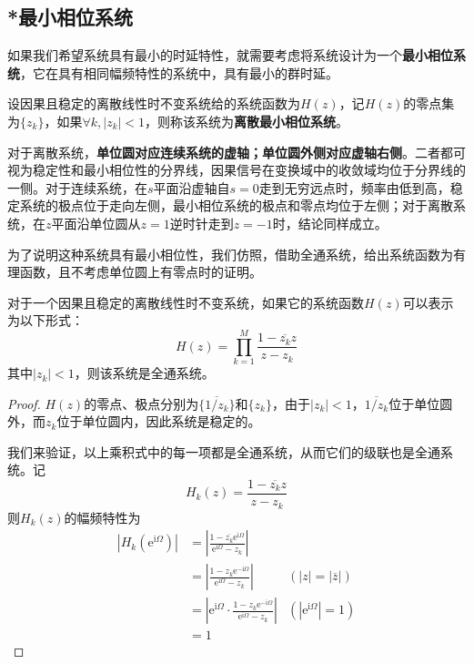 \subsection{*最小相位系统}\label{sub:minimum_phase}

如果我们希望系统具有最小的时延特性，就需要考虑将系统设计为一个\textbf{最小相位系统}，它在具有相同幅频特性的系统中，具有最小的群时延。
\begin{definition}[离散最小相位系统]
    设因果且稳定的离散线性时不变系统给的系统函数为$H(z)$，记$H(z)$的零点集为$\{z_k\}$，如果$\forall k,|z_k|<1$，则称该系统为\textbf{离散最小相位系统}。
\end{definition} 

对于离散系统，\textbf{单位圆对应连续系统的虚轴；单位圆外侧对应虚轴右侧}。二者都可视为稳定性和最小相位性的分界线，因果信号在变换域中的收敛域均位于分界线的一侧。对于连续系统，在$s$平面沿虚轴自$s=0$走到无穷远点时，频率由低到高，稳定系统的极点位于走向左侧，最小相位系统的极点和零点均位于左侧；对于离散系统，在$z$平面沿单位圆从$z=1$逆时针走到$z=-1$时，结论同样成立。

为了说明这种系统具有最小相位性，我们仿照，借助全通系统，给出系统函数为有理函数，且不考虑单位圆上有零点时的证明。

\begin{lemma}[离散全通系统]
    对于一个因果且稳定的离散线性时不变系统，如果它的系统函数$H(z)$可以表示为以下形式：
    $$H(z)=\prod_{k=1}^{M}\frac{1-\overline{z_k}z}{z-z_k}$$
    其中$|z_k|<1$，则该系统是全通系统。
\end{lemma}
\begin{proof}
    $H(z)$的零点、极点分别为$\{\overline{1/z_k}\}$和$\{z_k\}$，由于$|z_k|<1$，$\overline{1/z_k}$位于单位圆外，而$z_k$位于单位圆内，因此系统是稳定的。

    我们来验证，以上乘积式中的每一项都是全通系统，从而它们的级联也是全通系统。记
    $$H_k(z)=\frac{1-\overline{z_k}z}{z-z_k}$$
    则$H_k(z)$的幅频特性为\begin{align*}
        |H_k(\mathrm{e}^{\mathrm{i}\Omega})|&=\left|\frac{1-\overline{z_k}\mathrm{e}^{\mathrm{i}\Omega}}{\mathrm{e}^{\mathrm{i}\Omega}-z_k}\right|\\
        &=\left|\frac{1-z_k \mathrm{e}^{-\mathrm{i}\Omega}}{\mathrm{e}^{\mathrm{i}\Omega}-z_k}\right|&(|z|=|\overline{z}|)\\
        &=\left|\mathrm{e}^{\mathrm{i}\Omega}\cdot\frac{1-z_k \mathrm{e}^{-\mathrm{i}\Omega}}{\mathrm{e}^{\mathrm{i}\Omega}-z_k}\right|&(|\mathrm{e}^{\mathrm{i}\Omega}|=1)\\
        &=1
    \end{align*}
\end{proof}

